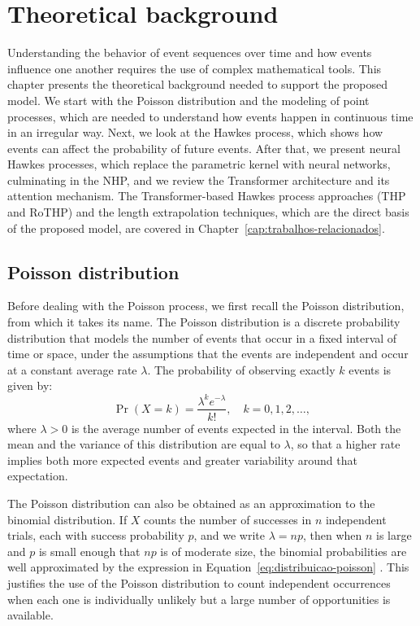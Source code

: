\chapter{Theoretical background}
\label{cap:fundamentacao-teorica}

Understanding the behavior of event sequences over time and how events influence one another requires the use of complex mathematical tools. This chapter presents the theoretical background needed to support the proposed model. We start with the Poisson distribution and the modeling of point processes, which are needed to understand how events happen in continuous time in an irregular way. Next, we look at the Hawkes process, which shows how events can affect the probability of future events. After that, we present neural Hawkes processes, which replace the parametric kernel with neural networks, culminating in the \gls{NHP}, and we review the Transformer architecture and its attention mechanism. The Transformer-based Hawkes process approaches (THP and RoTHP) and the length extrapolation techniques, which are the direct basis of the proposed model, are covered in Chapter~\ref{cap:trabalhos-relacionados}.

\section{Poisson distribution}\label{sec:distribuicao-de-poisson}

    Before dealing with the Poisson process, we first recall the Poisson distribution, from which it takes its name. The Poisson distribution is a discrete probability distribution that models the number of events that occur in a fixed interval of time or space, under the assumptions that the events are independent and occur at a constant average rate $\lambda$. The probability of observing exactly $k$ events is given by:
    \begin{equation}
        \Pr(X = k) = \frac{\lambda^{k} e^{-\lambda}}{k!}, \quad k = 0, 1, 2, \ldots,
        \label{eq:distribuicao-poisson}
    \end{equation}
    where $\lambda > 0$ is the average number of events expected in the interval. Both the mean and the variance of this distribution are equal to $\lambda$, so that a higher rate implies both more expected events and greater variability around that expectation.

    The Poisson distribution can also be obtained as an approximation to the binomial distribution. If $X$ counts the number of successes in $n$ independent trials, each with success probability $p$, and we write $\lambda = np$, then when $n$ is large and $p$ is small enough that $np$ is of moderate size, the binomial probabilities are well approximated by the expression in Equation~\eqref{eq:distribuicao-poisson} \cite{ross_first_2019}. This justifies the use of the Poisson distribution to count independent occurrences when each one is individually unlikely but a large number of opportunities is available.
  
